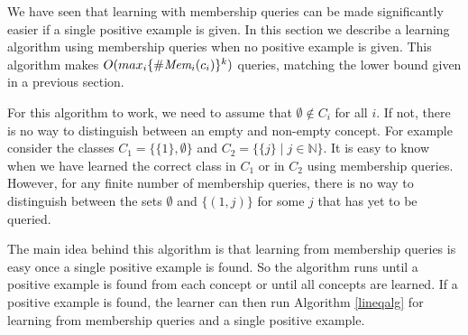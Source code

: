 We have seen that learning with membership queries can be made significantly easier if a single positive example is given. 
In this section we describe a learning algorithm using membership queries when no positive example is given. 
This algorithm makes $O(max_i \{ \#\emph{Mem}_{i}(c_i) \}^k)$ queries, matching the lower bound given in a previous section. 

For this algorithm to work, we need to assume that $\emptyset \not\in C_i$ for all $i$.
If not, there is no way to distinguish between an empty and non-empty concept. 
For example consider the classes $C_1 = \{ \{1\}, \emptyset \}$ and $C_2 = \{ \{j \} \mid j \in \mathbb{N} \}$. 
It is easy to know when we have learned the correct class in $C_1$ or in $C_2$ using membership queries. 
However, for any finite number of membership queries, there is no way to distinguish between the sets $\emptyset$ and $\{(1,j)\}$ for some $j$ that has yet to be queried.


The main idea behind this algorithm is that learning from membership queries is easy once a single positive example is found. 
So the algorithm runs until a positive example is found from each concept or until all concepts are learned. 
If a positive example is found, the learner can then run Algorithm \ref{lineqalg} for learning from membership queries and a single positive example. 


